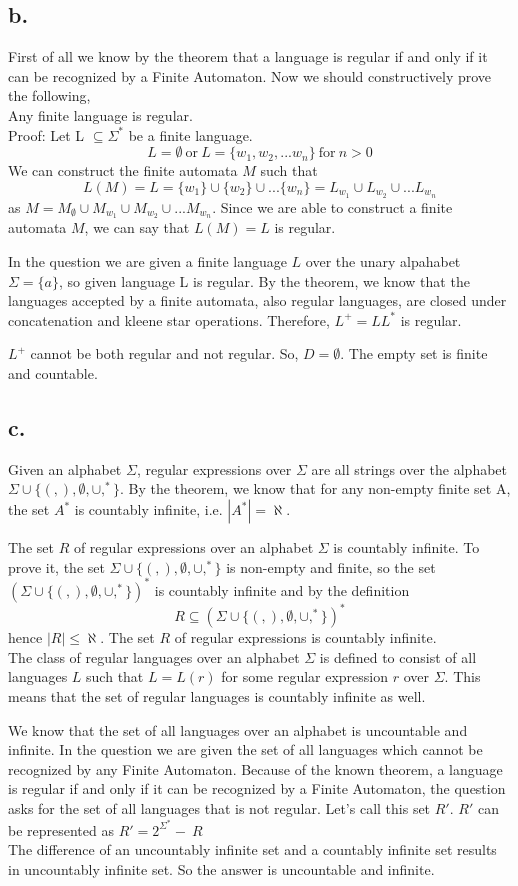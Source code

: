 \documentclass[12pt]{article}
\begin{document}
\subsection*{b.}  
First of all we know by the theorem that a language is regular if and only if it can be recognized by a Finite Automaton. Now we should constructively prove the following, \\
Any finite language is regular. \\
Proof: Let L $\subseteq \Sigma ^*$ be a finite language.
$$L=\emptyset \ \text{or}\ L=\{w_1,w_2,...w_n\}\ \text{for}\ n>0$$
We can construct the finite automata $M$ such that
$$L(M)=L=\{w_1\}\cup \{w_2\}\cup ... \{w_n\} = L_{w_1}\cup L_{w_2}\cup ... L_{w_n}$$ 
as $M= M_{\emptyset}\cup M_{w_1}\cup M_{w_2}\cup ... M_{w_n}$. Since we are able to construct a finite automata $M$, we can say that $L(M)=L$ is regular. \par
In the question we are given a finite language $L$ over the unary alpahabet $\Sigma=\{a\}$, so given language L is regular.
By the theorem, we know that the languages accepted by a finite automata, also regular languages, are closed under concatenation and kleene star operations. Therefore, $L^+=LL^*$ is regular. \par
$L^+$ cannot be both regular and not regular. So, $D=\emptyset$. The empty set is finite and countable. 


\subsection*{c.}
Given an alphabet $\Sigma$, regular expressions over $\Sigma$ are all strings over the alphabet 
$\Sigma \cup \{(,),\emptyset,\cup,^*\}$. 
By the theorem, we know that for any non-empty finite set A, the set $A^*$ is countably infinite, i.e. $|A^*|=\aleph$. \par
The set $R$ of regular expressions over an alphabet $\Sigma$ is countably infinite. To prove it, the set $\Sigma \cup \{(,),\emptyset,\cup,^*\}$ is non-empty and finite, so the set $(\Sigma \cup \{(,),\emptyset,\cup,^*\})^*$ is countably infinite and by the definition
$$R\subseteq (\Sigma \cup \{(,),\emptyset,\cup,^*\})^*$$ 
hence $|R|\leq \aleph$. The set $R$ of regular expressions is countably infinite. \\
The class of regular languages over an alphabet $\Sigma$ is defined to consist of all languages $L$ such that $L=L(r)$ for some regular expression $r$ over $\Sigma$. This means that the set of regular languages is countably infinite as well. \par
We know that the set of all languages over an alphabet is uncountable and infinite. In the question we are given the set of all languages which cannot be recognized by any Finite Automaton. Because of the known theorem, a language is regular if and only if it can be recognized by a Finite Automaton, the question asks for the set of all languages that is not regular. Let's call this set $R'$. $R'$ can be represented as $R'=2^{\Sigma ^*}  -\ R$ \\
The difference of an uncountably infinite set and a countably infinite set results in uncountably infinite set. So the answer is uncountable and infinite.
 
\end{document}
